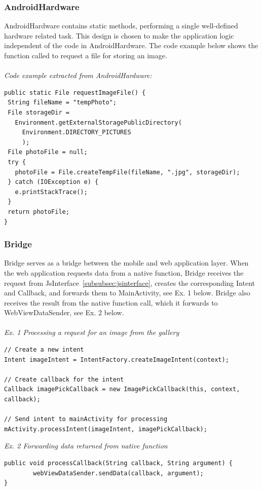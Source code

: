 \subsubsection{AndroidHardware}
AndroidHardware contains static methods, performing a single well-defined hardware related task. This design is chosen to make the application logic independent of the code in AndroidHardware. The code example below shows the function called to request a file for storing an image.
	\\\\
	\emph{Code example extracted from AndroidHardware:}
\begin{lstlisting}
public static File requestImageFile() {
 String fileName = "tempPhoto";
 File storageDir = 
   Environment.getExternalStoragePublicDirectory(
     Environment.DIRECTORY_PICTURES
     );
 File photoFile = null;
 try {
   photoFile = File.createTempFile(fileName, ".jpg", storageDir);
 } catch (IOException e) {
   e.printStackTrace();
 }
 return photoFile;
}
\end{lstlisting}
	
\subsubsection{Bridge} 
Bridge serves as a bridge between the mobile and web application layer. When the web application requests data from a native function, Bridge receives the request from JsInterface~\ref{subsubsec:jsinterface}, creates the corresponding Intent and Callback, and forwards them to MainActivity, see Ex. 1 below. Bridge also receives the result from the native function call, which it forwards to WebViewDataSender, see Ex. 2 below.
\\\\
\emph{Ex. 1 Processing a request for an image from the gallery}
\begin{lstlisting}
// Create a new intent
Intent imageIntent = IntentFactory.createImageIntent(context);

// Create callback for the intent
Callback imagePickCallback = new ImagePickCallback(this, context, callback);

// Send intent to mainActivity for processing
mActivity.processIntent(imageIntent, imagePickCallback);
\end{lstlisting}

\emph{Ex. 2 Forwarding data returned from native function}
\begin{lstlisting}
public void processCallback(String callback, String argument) {
        webViewDataSender.sendData(callback, argument);
}
\end{lstlisting}
	
